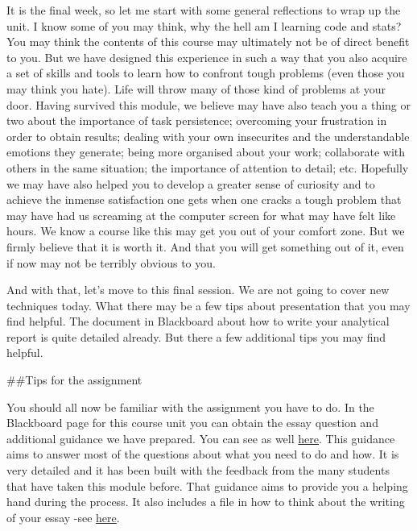 \documentclass[
]{book}
\begin{document}
It is the final week, so let me start with some general reflections to wrap up the unit. I know some of you may think, why the hell am I learning code and stats? You may think the contents of this course may ultimately not be of direct benefit to you. But we have designed this experience in such a way that you also acquire a set of skills and tools to learn how to confront tough problems (even those you may think you hate). Life will throw many of those kind of problems at your door. Having survived this module, we believe may have also teach you a thing or two about the importance of task persistence; overcoming your frustration in order to obtain results; dealing with your own insecurites and the understandable emotions they generate; being more organised about your work; collaborate with others in the same situation; the importance of attention to detail; etc. Hopefully we may have also helped you to develop a greater sense of curiosity and to achieve the inmense satisfaction one gets when one cracks a tough problem that may have had us screaming at the computer screen for what may have felt like hours. We know a course like this may get you out of your comfort zone. But we firmly believe that it is worth it. And that you will get something out of it, even if now may not be terribly obvious to you.

And with that, let's move to this final session. We are not going to cover new techniques today. What there may be a few tips about presentation that you may find helpful. The document in Blackboard about how to write your analytical report is quite detailed already. But there a few additional tips you may find helpful.

\#\#Tips for the assignment

You should all now be familiar with the assignment you have to do. In the Blackboard page for this course unit you can obtain the essay question and additional guidance we have prepared. You can see as well \href{https://github.com/jjmedinaariza/modelling_book/blob/master/files_docs/STEPS\%20IN\%20THE\%20ANALYSIS\%20REQUIRED\%20FOR\%20THE\%20ESSAY.pdf}{here}. This guidance aims to answer most of the questions about what you need to do and how. It is very detailed and it has been built with the feedback from the many students that have taken this module before. That guidance aims to provide you a helping hand during the process. It also includes a file in how to think about the writing of your essay -see \href{https://github.com/jjmedinaariza/modelling_book/blob/master/files_docs/WRITING\%20THE\%20ESSAY.pdf}{here}.
\end{document}
